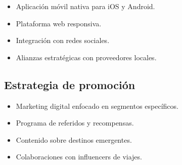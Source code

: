 \documentclass[12pt,a4paper]{article}
\newcommand{\subsectiontitle}[1]{\subsection{#1}}
\begin{document}
\begin{itemize}
    \item Aplicación móvil nativa para iOS y Android.
    \item Plataforma web responsiva.
    \item Integración con redes sociales.
    \item Alianzas estratégicas con proveedores locales.
\end{itemize}

\subsectiontitle{Estrategia de promoción}

\begin{itemize}
    \item Marketing digital enfocado en segmentos específicos.
    \item Programa de referidos y recompensas.
    \item Contenido sobre destinos emergentes.
    \item Colaboraciones con influencers de viajes.
\end{itemize}
\end{document}
